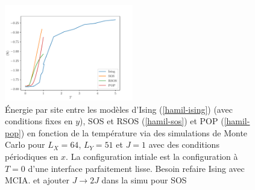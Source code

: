 \begin{figure}
    \centering
    \includegraphics[width=0.5\textwidth]{isingtosos/comparaison-modeles.pdf}
    \caption{Énergie par site entre les modèles d'Ising (\ref{hamil-ising}) (avec conditions fixes en $y$), SOS et RSOS (\ref{hamil-sos}) et POP (\ref{hamil-pop}) en fonction de la température via des simulations de Monte Carlo pour $L_X=64$, $L_Y=51$ et $J=1$ avec des conditions périodiques en $x$. La configuration intiale est la configuration à $T=0$ d'une interface parfaitement lisse. {\color{red} Besoin refaire Ising avec MCIA. et ajouter $J\to2J$ dans la simu pour SOS} }
    \label{comparaison-modeles}
\end{figure}